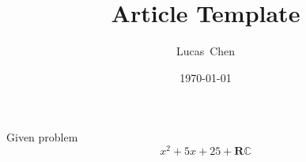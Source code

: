 \documentclass{amsart}
\title{Article Template}
\author{Lucas\ Chen}
\date{\today}
\begin{document}
\maketitle

Given problem $$x^2+5x+25 + \mathbf{R} \mathbb{C}$$
\end{document}
